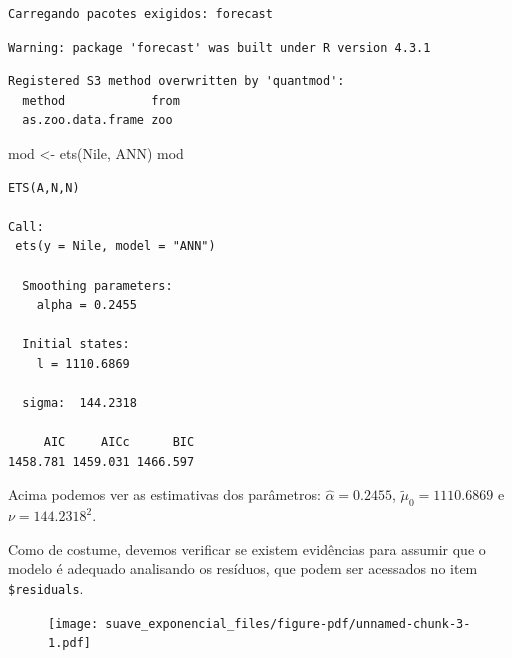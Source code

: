\documentclass[
  letterpaper,
  DIV=11,
  numbers=noendperiod]{scrreprt}
\newenvironment{Shaded}{\begin{snugshade}}{\end{snugshade}}
\newcommand{\FunctionTok}[1]{\textcolor[rgb]{0.28,0.35,0.67}{#1}}
\newcommand{\NormalTok}[1]{\textcolor[rgb]{0.00,0.23,0.31}{#1}}
\newcommand{\OtherTok}[1]{\textcolor[rgb]{0.00,0.23,0.31}{#1}}
\newcommand{\SpecialCharTok}[1]{\textcolor[rgb]{0.37,0.37,0.37}{#1}}
\newcommand{\StringTok}[1]{\textcolor[rgb]{0.13,0.47,0.30}{#1}}
\theoremstyle{definition}
\theoremstyle{plain}
\theoremstyle{definition}
\theoremstyle{plain}
\theoremstyle{remark}
\begin{document}
\begin{verbatim}
Carregando pacotes exigidos: forecast
\end{verbatim}

\begin{verbatim}
Warning: package 'forecast' was built under R version 4.3.1
\end{verbatim}

\begin{verbatim}
Registered S3 method overwritten by 'quantmod':
  method            from
  as.zoo.data.frame zoo 
\end{verbatim}

\begin{Shaded}
\begin{Highlighting}[]
\NormalTok{mod }\OtherTok{\textless{}{-}} \FunctionTok{ets}\NormalTok{(Nile, }\StringTok{\textquotesingle{}ANN\textquotesingle{}}\NormalTok{)}
\NormalTok{mod}
\end{Highlighting}
\end{Shaded}

\begin{verbatim}
ETS(A,N,N) 

Call:
 ets(y = Nile, model = "ANN") 

  Smoothing parameters:
    alpha = 0.2455 

  Initial states:
    l = 1110.6869 

  sigma:  144.2318

     AIC     AICc      BIC 
1458.781 1459.031 1466.597 
\end{verbatim}

Acima podemos ver as estimativas dos parâmetros:
\(\hat{\alpha}=0.2455\), \(\tilde{\mu}_0=1110.6869\) e
\(\nu=144.2318^2\).

Como de costume, devemos verificar se existem evidências para assumir
que o modelo é adequado analisando os resíduos, que podem ser acessados
no item \texttt{\$residuals}.

\begin{Shaded}
\end{Shaded}

\begin{figure}[H]

{\centering \texttt{[image: suave\_exponencial\_files/figure-pdf/unnamed-chunk-3-1.pdf]}

}

\end{figure}
\end{document}
